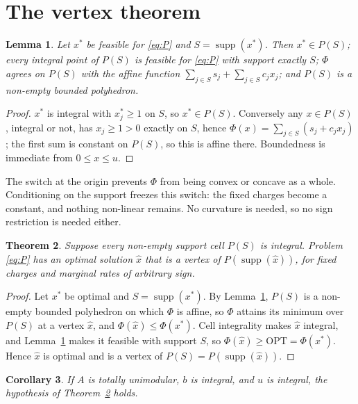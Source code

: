 \documentclass[review,11pt]{elsarticle}
\newtheorem{theorem}{Theorem}
\newtheorem{lemma}[theorem]{Lemma}
\newtheorem{corollary}[theorem]{Corollary}
\theoremstyle{remark}
\theoremstyle{definition}
\newcommand{\supp}{\operatorname{supp}}
\newcommand{\OPT}{\mathrm{OPT}}
\begin{document}
\section{The vertex theorem}

\begin{lemma}\label{lem:cell}
Let $x^{*}$ be feasible for \eqref{eq:P} and $S=\supp(x^{*})$. Then $x^{*}\in P(S)$;
every integral point of $P(S)$ is feasible for \eqref{eq:P} with support exactly $S$;
$\Phi$ agrees on $P(S)$ with the affine function $\sum_{j\in S}s_j+\sum_{j\in S}c_jx_j$;
and $P(S)$ is a non-empty bounded polyhedron.
\end{lemma}

\begin{proof}
$x^{*}$ is integral with $x^{*}_j\ge1$ on $S$, so $x^{*}\in P(S)$. Conversely any
$x\in P(S)$, integral or not, has $x_j\ge1>0$ exactly on $S$, hence
$\Phi(x)=\sum_{j\in S}(s_j+c_jx_j)$; the first sum is constant on $P(S)$, so this is
affine there. Boundedness is immediate from $0\le x\le u$.
\end{proof}

The switch at the origin prevents $\Phi$ from being convex or concave as a whole.
Conditioning on the support freezes this switch: the fixed charges become a constant,
and nothing non-linear remains. No curvature is needed, so no sign
restriction is needed either.

\begin{theorem}\label{thm:main}
Suppose every non-empty support cell $P(S)$ is integral. Problem \eqref{eq:P} has an
optimal solution $\hat x$ that is a vertex of $P(\supp(\hat x))$, for fixed charges and
marginal rates of arbitrary sign.
\end{theorem}

\begin{proof}
Let $x^{*}$ be optimal and $S=\supp(x^{*})$. By Lemma~\ref{lem:cell}, $P(S)$ is a
non-empty bounded polyhedron on which $\Phi$ is affine, so $\Phi$ attains its minimum
over $P(S)$ at a vertex $\hat x$, and $\Phi(\hat x)\le\Phi(x^{*})$. Cell integrality
makes $\hat x$ integral, and Lemma~\ref{lem:cell} makes it feasible with support $S$, so
$\Phi(\hat x)\ge\OPT=\Phi(x^{*})$. Hence $\hat x$ is optimal and is a vertex of
$P(S)=P(\supp(\hat x))$.
\end{proof}

\begin{corollary}\label{cor:tu}
If $A$ is totally unimodular, $b$ is integral, and $u$ is integral, the hypothesis of
Theorem~\ref{thm:main} holds.
\end{corollary}
\end{document}
